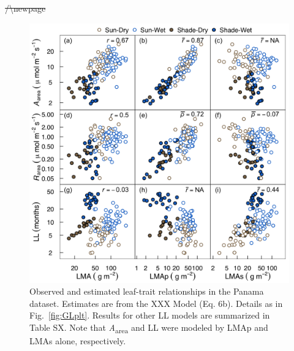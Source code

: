 \documentclass[
  12pt,
]{article}
\providecommand{\DIFdeltex}[1]{{\protect\color{red}\sout{#1}}}                      %
\providecommand{\DIFaddend}{} %
\providecommand{\DIFdelbegin}{} %
\providecommand{\DIFdelend}{} %
\providecommand{\DIFaddbeginFL}{} %
\providecommand{\DIFaddendFL}{} %
\providecommand{\DIFdelbeginFL}{} %
\providecommand{\DIFdelendFL}{} %
\providecommand{\DIFdel}[1]{\texorpdfstring{\DIFdeltex{#1}}{}} %
\newcommand{\DIFscaledelfig}{0.5}
\newlength{\DIFdelgraphicswidth} %
\newlength{\DIFdelgraphicsheight} %
\newcommand{\DIFaddincludegraphics}[2][]{{\color{blue}\fbox{\DIFOincludegraphics[#1]{#2}}}} %
\newcommand{\DIFdelincludegraphics}[2][]{%
\sbox{\DIFdelgraphicsbox}{\DIFOincludegraphics[#1]{#2}}%
\settoboxwidth{\DIFdelgraphicswidth}{\DIFdelgraphicsbox} %
\settoboxtotalheight{\DIFdelgraphicsheight}{\DIFdelgraphicsbox} %
\scalebox{\DIFscaledelfig}{%
\parbox[b]{\DIFdelgraphicswidth}{\usebox{\DIFdelgraphicsbox}\\[-\baselineskip] \rule{\DIFdelgraphicswidth}{0em}}\llap{\resizebox{\DIFdelgraphicswidth}{\DIFdelgraphicsheight}{%
\setlength{\unitlength}{\DIFdelgraphicswidth}%
\begin{picture}(1,1)%
\thicklines\linethickness{2pt} %
{\color[rgb]{1,0,0}\put(0,0){\framebox(1,1){}}}%
{\color[rgb]{1,0,0}\put(0,0){\line( 1,1){1}}}%
{\color[rgb]{1,0,0}\put(0,1){\line(1,-1){1}}}%
\end{picture}%
}\hspace*{3pt}}} %
} %
\DeclareRobustCommand{\DIFaddend}{\DIFOaddend \let\includegraphics\DIFOincludegraphics} %
\DeclareRobustCommand{\DIFdelbegin}{\DIFOdelbegin \let\includegraphics\DIFdelincludegraphics} %
\DeclareRobustCommand{\DIFdelend}{\DIFOaddend \let\includegraphics\DIFOincludegraphics} %
\DeclareRobustCommand{\DIFaddbeginFL}{\DIFOaddbeginFL \let\includegraphics\DIFaddincludegraphics} %
\DeclareRobustCommand{\DIFaddendFL}{\DIFOaddendFL \let\includegraphics\DIFOincludegraphics} %
\DeclareRobustCommand{\DIFdelbeginFL}{\DIFOdelbeginFL \let\includegraphics\DIFdelincludegraphics} %
\DeclareRobustCommand{\DIFdelendFL}{\DIFOaddendFL \let\includegraphics\DIFOincludegraphics} %
\begin{document}
\DIFaddend \newpage
\DIFdelbegin \DIFdel{/\textbackslash newpage
}\DIFdelend 

\begin{figure}
\DIFdelbeginFL %
\DIFdelendFL \DIFaddbeginFL \hypertarget{fig:PAplt}{%
\centering
\includegraphics{../figs/PA_scatter.png}
\caption{Observed and estimated leaf-trait relationships in the Panama dataset.
Estimates are from the XXX Model (Eq. 6b).
Details as in Fig.~\ref{fig:GLplt}.
Results for other LL models are summarized in Table SX.
Note that \emph{A}\textsubscript{area} and LL were modeled by LMAp and LMAs alone, respectively.}\label{fig:PAplt}
}
\DIFaddendFL \end{figure}
\end{document}
